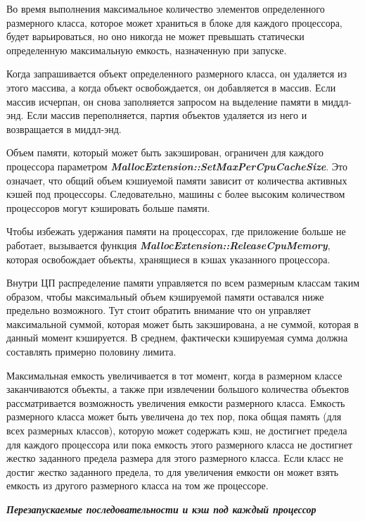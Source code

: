 Во время выполнения максимальное количество элементов определенного размерного класса, которое может храниться в блоке для каждого процессора, будет варьироваться, но оно никогда не может превышать статически определенную максимальную емкость, назначенную при запуске.

Когда запрашивается объект определенного размерного класса, он удаляется из этого массива, а когда объект освобождается, он добавляется в массив. Если массив исчерпан, он снова заполняется запросом на выделение памяти в миддл-энд. Если массив переполняется, партия объектов удаляется из него и возвращается в миддл-энд.

Объем памяти, который может быть закэширован, ограничен для каждого процессора параметром \textbf{\textit{MallocExtension::SetMaxPerCpuCacheSize}}. Это означает, что общий объем кэшиуемой памяти зависит от количества активных кэшей под процессоры. Следовательно, машины с более высоким количеством процессоров могут кэшировать больше памяти.

Чтобы избежать удержания памяти на процессорах, где приложение больше не работает, вызывается функция \textbf{\textit{MallocExtension::ReleaseCpuMemory}}, которая освобождает объекты, хранящиеся в кэшах указанного процессора.

Внутри ЦП распределение памяти управляется по всем размерным классам таким образом, чтобы максимальный объем кэшируемой памяти оставался ниже предельно возможного. Тут стоит обратить внимание что он управляет максимальной суммой, которая может быть закэширована, а не суммой, которая в данный момент кэшируется. В среднем, фактически кэшируемая сумма должна составлять примерно половину лимита.

Максимальная емкость увеличивается в тот момент, когда в размерном классе заканчиваются объекты, а также при извлечении большого количества объектов рассматривается возможность увеличения емкости размерного класса. Емкость размерного класса может быть увеличена до тех пор, пока общая память (для всех размерных классов), которую может содержать кэш, не достигнет предела для каждого процессора или пока емкость этого размерного класса не достигнет жестко заданного предела размера для этого размерного класса. Если класс не достиг жестко заданного предела, то для увеличения емкости он может взять емкость из другого размерного класса на том же процессоре.

\bigbreak
\textit{\textbf{Перезапускаемые последовательности и кэш под каждый процессор}}

